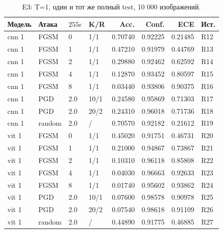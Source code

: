 \begin{table}[H]\centering\footnotesize
\setlength{\tabcolsep}{4pt}
\caption{E3: T=1, один и тот же полный test, 10 000 изображений.}\label{tab:attacks}
\begin{tabular}{lll lrrrl}
\toprule
Модель & Атака & $255\epsilon$ & K/R & Acc. & Conf. & ECE & Ист. \\
\midrule
cnn 1 & FGSM & 0 & 1/1 & 0.70740 & 0.92225 & 0.21485 & R12 \\
cnn 1 & FGSM & 1 & 1/1 & 0.47210 & 0.91979 & 0.44769 & R13 \\
cnn 1 & FGSM & 2 & 1/1 & 0.29880 & 0.92462 & 0.62592 & R14 \\
cnn 1 & FGSM & 4 & 1/1 & 0.12870 & 0.93452 & 0.80597 & R15 \\
cnn 1 & FGSM & 8 & 1/1 & 0.03440 & 0.93806 & 0.90375 & R16 \\
cnn 1 & PGD & 2.0 & 10/1 & 0.24580 & 0.95869 & 0.71303 & R17 \\
cnn 1 & PGD & 2.0 & 20/2 & 0.24310 & 0.96018 & 0.71736 & R18 \\
cnn 1 & random & 2.0 & / & 0.70570 & 0.92182 & 0.21612 & R19 \\
vit 1 & FGSM & 0 & 1/1 & 0.45020 & 0.91751 & 0.46731 & R20 \\
vit 1 & FGSM & 1 & 1/1 & 0.21000 & 0.94867 & 0.73867 & R21 \\
vit 1 & FGSM & 2 & 1/1 & 0.10310 & 0.96118 & 0.85808 & R22 \\
vit 1 & FGSM & 4 & 1/1 & 0.04030 & 0.96663 & 0.92633 & R23 \\
vit 1 & FGSM & 8 & 1/1 & 0.01740 & 0.95602 & 0.93862 & R24 \\
vit 1 & PGD & 2.0 & 10/1 & 0.07600 & 0.98578 & 0.90978 & R25 \\
vit 1 & PGD & 2.0 & 20/2 & 0.07540 & 0.98618 & 0.91109 & R26 \\
vit 1 & random & 2.0 & / & 0.44890 & 0.91775 & 0.46885 & R27 \\
\bottomrule
\end{tabular}
\end{table}
